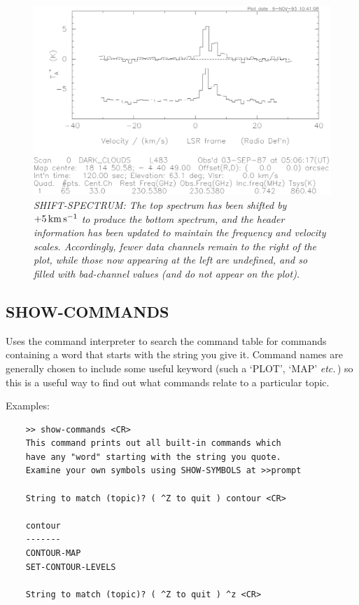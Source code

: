 \documentclass[11pt,twoside]{report}
\newcommand{\etc}{{\it etc.\,}}
\newcommand{\kms}{{\rm\,km\,s^{-1}}}
\begin{document}
\begin{figure}[htbp]
\begin{center}
\includegraphics[scale=0.65]{shift.ps}
\protect\parbox{5.5in}
{\caption[SHIFT]
{\sl
SHIFT-SPECTRUM: The top spectrum has been shifted by $+5\kms$ to produce
the bottom spectrum, and the header information has been updated to maintain
the frequency and velocity scales. Accordingly, fewer data channels remain to
the right of the plot, while those now appearing at the left are undefined, and
so filled with bad-channel values (and do not appear on the plot). 
\label{SHIFT}
}
}
\end{center}
\end{figure}

\subsection{SHOW-COMMANDS} 

Uses the command interpreter to search the command table 
for commands containing a word that starts with the string you give it. Command
names are generally chosen to include some useful keyword  (such
a `PLOT', `MAP' \etc) so this is a useful way to find out what commands relate
to a particular topic. 

Examples:
\begin{verbatim}
    >> show-commands <CR>
    This command prints out all built-in commands which
    have any "word" starting with the string you quote.
    Examine your own symbols using SHOW-SYMBOLS at >>prompt

    String to match (topic)? ( ^Z to quit ) contour <CR>

    contour
    -------
    CONTOUR-MAP
    SET-CONTOUR-LEVELS      

    String to match (topic)? ( ^Z to quit ) ^z <CR>
\end{verbatim}
\end{document}
